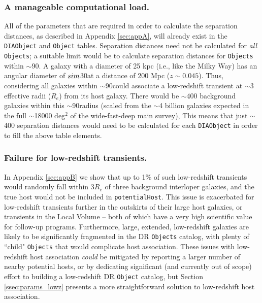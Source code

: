 \documentclass[DM,authoryear,toc]{lsstdoc}
\begin{document}
\subsubsection{A manageable computational load.}\label{sssec:params_trans_comp}
All of the parameters that are required in order to calculate the separation distances, as described in Appendix \ref{sec:appA}, will already exist in the {\tt DIAObject} and {\tt Object} tables.
Separation distances need not be calculated for \textit{all} {\tt Objects}; a suitable limit would be to calculate separation distances for {\tt Objects} within $\sim$90\arcsec.
A galaxy with a diameter of 25 kpc (i.e., like the Milky Way) has an angular diameter of $\\sim$30\arcsec at a distance of 200 Mpc ($z\sim0.045$).
Thus, considering all galaxies within $\sim$90\arcsec could associate a low-redshift transient at $\sim$3 effective radii ($R_e$) from its host galaxy.
There would be $\sim$400 background galaxies within this $\sim$90\arcsec radius (scaled from the $\sim$4 billion galaxies expected in the full $\sim$18000 deg$^2$ of the wide-fast-deep main survey), 
This means that just $\sim$400 separation distances would need to be calculated for each {\tt DIAObject} in order to fill the above table elements. 

\subsubsection{Failure for low-redshift transients.}\label{sssec:params_trans_fail}
In Appendix \ref{sec:appB} we show that up to 1\% of such low-redshift transients would randomly fall within $3R_e$ of three background interloper galaxies, and the true host would not be included in {\tt potentialHost}.
This issue is exacerbated for low-redshift transients further in the outskirts of their large host galaxies, or transients in the Local Volume -- both of which have a very high scientific value for follow-up programs.
Furthermore, large, extended, low-redshift galaxies are likely to be significantly fragmented in the DR {\tt Objects} catalog, with plenty of ``child" {\tt Objects} that would complicate host association.
These issues with low-redshift host association \textit{could} be mitigated by reporting a larger number of nearby potential hosts, or by dedicating significant (and currently out of scope) effort to building a low-redshift DR {\tt Object} catalog, but Section \ref{ssec:params_lowz} presents a more straightforward solution to low-redshift host association.
\end{document}
